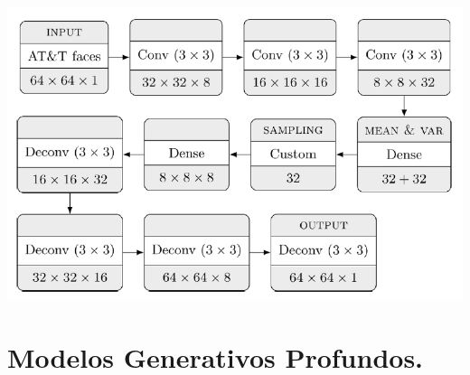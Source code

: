 \begin{enumerate}
\begin{itemize}
        \vspace{5mm}
        \begin{center}
            \includegraphics[width = .6\textwidth]{imagenes/AE_Variacional_Estructura_1.png}
        \end{center}
        \vspace{5mm}
    \end{itemize}
\end{enumerate}

\newpage


\section{Modelos Generativos Profundos.}




